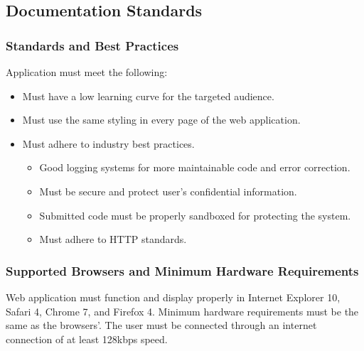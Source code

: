 \subsection{Documentation Standards}
\label{sec:stand}
\subsubsection{Standards and Best Practices}

Application must meet the following:

\begin{itemize}
\item Must have a low learning curve for the targeted audience.
\item Must use the same styling in every page of the web application.
\item Must adhere to industry best practices.
\begin{itemize}
\item Good logging systems for more maintainable code and error correction.
\item Must be secure and protect user's confidential information.
\item Submitted code must be properly sandboxed for protecting the system.
\item Must adhere to HTTP standards.
\end{itemize}
\end{itemize}

\subsubsection{Supported Browsers and Minimum Hardware Requirements}

Web application must function and display properly in Internet Explorer 10, 
Safari 4, Chrome 7, and Firefox 4. Minimum hardware requirements must be the same as the browsers'. The user must be connected through an internet connection of at least 128kbps speed.
